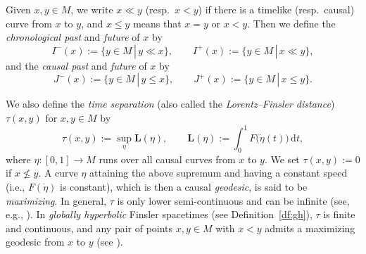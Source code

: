 \documentclass[a4paper,11pt]{article}
\numberwithin{equation}{section}
\theoremstyle{definition}
\theoremstyle{plain}
\newcommand{\lra}{\longrightarrow}
\newcommand{\dd}{\mathrm{d}}
\newcommand{\bL}{\ensuremath{\mathbf{L}}}
\begin{document}
Given $x,y \in M$, we write $x \ll y$ (resp.\ $x<y$)
if there is a timelike (resp.\ causal) curve from $x$ to $y$,
and $x \le y$ means that $x=y$ or $x<y$.
Then we define the \emph{chronological past} and \emph{future} of $x$ by
\[ I^-(x):=\{y \in M \,|\, y \ll x\}, \qquad I^+(x):=\{y \in M \,|\, x \ll y\}, \]
and the \emph{causal past} and \emph{future} of $x$ by
\[ J^-(x):=\{y \in M \,|\, y \le x\}, \qquad J^+(x):=\{y \in M \,|\, x \le y\}. \]

We also define the \emph{time separation} (also called the \emph{Lorentz--Finsler distance}) $\tau(x,y)$ for $x,y \in M$ by
\begin{equation}\label{timesep} \tau(x,y) :=\sup_{\eta} \bL(\eta), \qquad
 \bL(\eta) :=\int_0^1 F\big( \dot{\eta}(t) \big) \,\dd t, \end{equation}
where $\eta\colon [0,1] \lra M$ runs over all causal curves from $x$ to $y$. We set $\tau(x,y):= 0$ if $x \not \leq y$.
A curve $\eta$ attaining the above supremum and having a constant speed (i.e., $F(\dot\eta)$ is constant), which is then a causal \emph{geodesic}, is said to be \emph{maximizing}.
In general, $\tau$ is only lower semi-continuous and can be infinite (see, e.g.,  \cite[Proposition~6.7]{Min-Ray}).
In \emph{globally hyperbolic} Finsler spacetimes (see Definition~\ref{df:gh}), $\tau$ is finite and continuous,
and any pair of points $x,y \in M$ with $x<y$ admits a maximizing geodesic from $x$ to $y$
(see \cite[Propositions~6.8, 6.9]{Min-Ray}).
\end{document}
